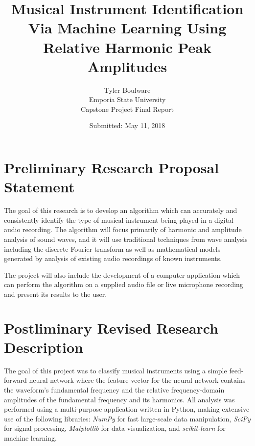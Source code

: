 \documentclass[12pt]{article}
\title{Musical Instrument Identification Via Machine Learning Using Relative Harmonic Peak Amplitudes}
\date{Submitted: May 11, 2018}
\author{Tyler Boulware\\Emporia State University\\Capstone Project Final Report}
\begin{document}
\maketitle

\section{Preliminary Research Proposal Statement}

The goal of this research is to develop an algorithm which can accurately and consistently identify the type of musical instrument being played in a digital audio recording. The algorithm will focus primarily of harmonic and amplitude analysis of sound waves, and it will use traditional techniques from wave analysis including the discrete Fourier transform as well as mathematical models generated by analysis of existing audio recordings of known instruments.

The project will also include the development of a computer application which can perform the algorithm on a supplied audio file or live microphone recording and present its results to the user.

\section{Postliminary Revised Research Description}

	The goal of this project was to classify musical instruments using a simple feed-forward neural network where the feature vector for the neural network contains the waveform's fundamental frequency and the relative frequency-domain amplitudes of the fundamental frequency and its harmonics. All analysis was performed using a multi-purpose application written in Python, making extensive use of the following libraries: \textit{NumPy} for fast large-scale data manipulation, \textit{SciPy} for signal processing, \textit{Matplotlib} for data visualization, and \textit{scikit-learn} for machine learning.
\end{document}
